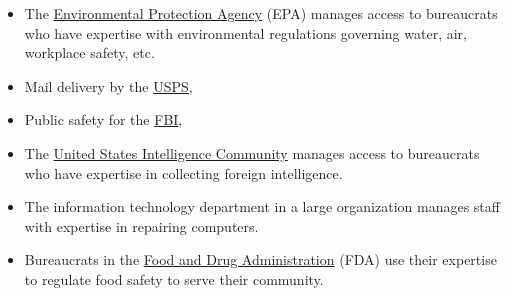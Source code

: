   \begin{itemize}
      \item The \href{https://en.wikipedia.org/wiki/United_States_Environmental_Protection_Agency}{Environmental Protection Agency} (EPA) manages access to bureaucrats who have expertise with environmental regulations governing water, air, workplace safety, etc.

      \item Mail delivery by the \href{https://en.wikipedia.org/wiki/United_States_Postal_Service}{USPS},%
%
\iftoggle{WPinmargin}{\marginpar{$>$Wikipedia: USPS}}{}


      \item Public safety for the \href{https://en.wikipedia.org/wiki/Federal_Bureau_of_Investigation}{FBI}, 
%
%

      \item The \href{https://www.intelligence.gov/}{United States Intelligence Community} manages access to bureaucrats who have expertise in collecting foreign intelligence.


      \item The information technology department in a large organization manages staff with expertise in repairing computers.

      \item Bureaucrats in the \href{https://www.fda.gov/}{Food and Drug Administration} (FDA) use their expertise to regulate food safety to serve their community.



\end{itemize}
